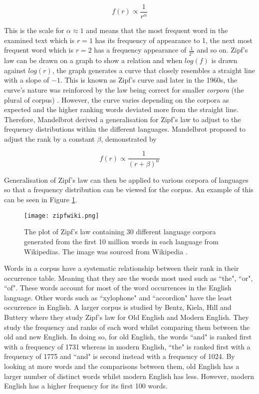 \begin{equation}\label{eq:zipfs}
f(r) \propto \frac{1}{r^{\alpha}}
\end{equation}

This is the scale for $\alpha \approx 1$ and means that the most frequent word in the examined text which is $r = 1$ has its frequency of appearance to 1, the next most frequent word which is $r = 2$ has a frequency appearance of $\frac{1}{2^{\alpha}}$ and so on. Zipf's law can be drawn on a graph to show a relation and when $log(f)$ is drawn against $log(r)$, the graph generates a curve that closely resembles a straight line with a slope of $-1$. This is known as Zipf's curve and later in the 1960s, the curve's nature was reinforced by the law being correct for smaller \emph{corpora} (the plural of corpus) \cite{sicilia2002extension}. However, the curve varies depending on the corpora as expected and the higher ranking words deviated more from the straight line. Therefore, Mandelbrot derived a generalisation for Zipf's law to adjust to the frequency distributions within the different languages. Mandelbrot proposed to adjust the rank by a constant $\beta$, demonstrated by

\begin{equation}\label{eq:zipfs}
f(r) \propto \frac{1}{(r + \beta)^{\alpha}}
\end{equation}

Generalisation of Zipf's law can then be applied to various corpora of languages so that a frequency distribution can be viewed for the corpus. An example of this can be seen in Figure \ref{fig:zipfwiki}.

\begin{figure}[!htb]
	\centering
	\texttt{[image: zipfwiki.png]}
	\caption{The plot of Zipf's law containing 30 different language corpora generated from the first 10 million words in each language from Wikipedias. The image was sourced from Wikipedia \cite{zipffigure}. }
	\label{fig:zipfwiki}
\end{figure}

Words in a corpus have a systematic relationship between their rank in their occurrence table. Meaning that they are the words most used such as ``the", ``or", ``of". These words account for most of the word occurrences in the English language. Other words such as ``xylophone" and ``accordion" have the least occurrence in English. A larger corpus is studied by Bentz, Kiela, Hill and Buttery \cite{BentzKielaHillButtery} where they study Zipf's law for Old English and Modern English. They study the frequency and ranks of each word whilst comparing them between the old and new English. In doing so, for old English, the words ``and" is ranked first with a frequency of 1731 whereas in modern English, ``the" is ranked first with a frequency of 1775 and ``and" is second instead with a frequency of 1024. By looking at more words and the comparisons between them, old English has a larger number of distinct words whilst modern English has less. However, modern English has a higher frequency for its first 100 words.

